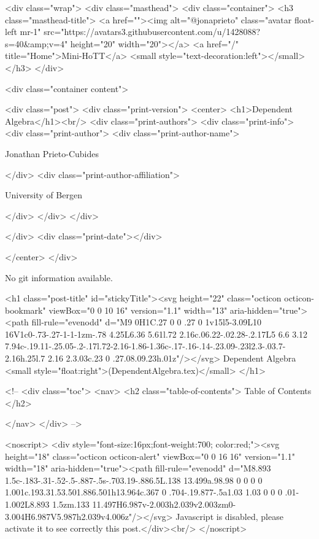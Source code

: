     <div class="wrap">
      <div class="masthead">
        <div class="container">
          <h3 class="masthead-title">
            <a href=""><img alt="@jonaprieto" class="avatar float-left mr-1" src="https://avatars3.githubusercontent.com/u/1428088?s=40&amp;v=4" height="20" width="20"></a>
            <a href="/" title="Home">Mini-HoTT</a>
            <small style="text-decoration:left"></small>
          </h3>
        </div>
      
      <div class="container content">
        







<div class="post">
  <div class="print-version">
    <center>
      <h1>Dependent Algebra</h1><br/>
        <div class="print-authors">
          <div class="print-info">
            <div class="print-author">
              <div class="print-author-name">
                
                  Jonathan Prieto-Cubides
                
              </div>
              <div class="print-author-affiliation">
                
                  University of Bergen
                
                </div>
            </div>
          </div>
          
          
        </div>
        <div class="print-date"></div>
        
        
    </center>
  </div>

  
  No git information available.
  

  <h1 class="post-title" id="stickyTitle"><svg height="22" class="octicon octicon-bookmark" viewBox="0 0 10 16" version="1.1" width="13" aria-hidden="true"><path fill-rule="evenodd" d="M9 0H1C.27 0 0 .27 0 1v15l5-3.09L10 16V1c0-.73-.27-1-1-1zm-.78 4.25L6.36 5.61l.72 2.16c.06.22-.02.28-.2.17L5 6.6 3.12 7.94c-.19.11-.25.05-.2-.17l.72-2.16-1.86-1.36c-.17-.16-.14-.23.09-.23l2.3-.03.7-2.16h.25l.7 2.16 2.3.03c.23 0 .27.08.09.23h.01z"/></svg> Dependent Algebra <small style="float:right">(DependentAlgebra.tex)</small>
  </h1>

  <!-- 
  <div class="toc">
    <nav>
    <h2 class="table-of-contents"> Table of Contents </h2>
      

    </nav>
  </div>
   -->

  <noscript>
  <div style="font-size:16px;font-weight:700; color:red;"><svg height="18" class="octicon octicon-alert" viewBox="0 0 16 16" version="1.1" width="18" aria-hidden="true"><path fill-rule="evenodd" d="M8.893 1.5c-.183-.31-.52-.5-.887-.5s-.703.19-.886.5L.138 13.499a.98.98 0 0 0 0 1.001c.193.31.53.501.886.501h13.964c.367 0 .704-.19.877-.5a1.03 1.03 0 0 0 .01-1.002L8.893 1.5zm.133 11.497H6.987v-2.003h2.039v2.003zm0-3.004H6.987V5.987h2.039v4.006z"/></svg> Javascript is disabled, please activate it to see correctly this post.</div><br/>
  </noscript>

